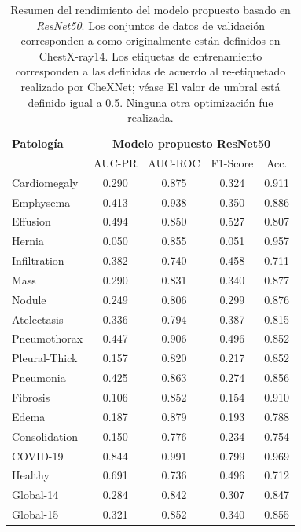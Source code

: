 {\begin{table}[tb]
    \centering
    \begin{tabular}{|l||c|c|c|c|}
        \hline
    {\bf Patología} 	    	&	\multicolumn{4}{c|}{\bf Modelo propuesto ResNet50}  \\
    \cline{2-5}
                        &	AUC-PR	&	AUC-ROC 	& F1-Score  & Acc.  \\
        \hline \hline
        Cardiomegaly	&	0.290	&	0.875	&	0.324	&	0.911	\\
        Emphysema	    &	0.413	&	0.938	&	0.350	&	0.886	\\
        Effusion	    &	0.494	&	0.850	&	0.527	&	0.807	\\
        Hernia	        &	0.050	&	0.855	&	0.051	&	0.957	\\
        Infiltration	&	0.382	&	0.740	&	0.458	&	0.711	\\
        Mass	        &	0.290	&	0.831	&	0.340	&	0.877	\\
        Nodule	        &	0.249	&	0.806	&	0.299	&	0.876	\\
        Atelectasis	    &	0.336	&	0.794	&	0.387	&	0.815	\\
        Pneumothorax	&	0.447	&	0.906	&	0.496	&	0.852	\\
        Pleural-Thick	&	0.157	&	0.820	&	0.217	&	0.852	\\
        Pneumonia	    &	0.425	&	0.863	&	0.274	&	0.856	\\
        Fibrosis	    &	0.106	&	0.852	&	0.154	&	0.910	\\
        Edema	        &	0.187	&	0.879	&	0.193	&	0.788	\\
        Consolidation	&	0.150	&	0.776	&	0.234	&	0.754	\\
        \hline
        COVID-19	    &	0.844	&	0.991	&	0.799	&	0.969	\\
        Healthy	        &	0.691	&	0.736	&	0.496	&	0.712	\\
        \hline\hline
        Global-14	    &	0.284	&	0.842	&	0.307	&	0.847	\\
        Global-15	    &	0.321	&	0.852	&	0.340	&	0.855	\\
    \hline
    \end{tabular}
    \caption{Resumen del rendimiento del modelo propuesto basado en \textit{ResNet50}.
            Los conjuntos de datos de validación corresponden a como originalmente
            están definidos en ChestX-ray14. Los etiquetas de entrenamiento corresponden a las
            definidas de acuerdo al re-etiquetado realizado por CheXNet; véase \cite{rajpurkar2018deep}
            El valor de umbral está definido igual a 0.5. Ninguna otra optimización fue realizada.}
    \label{table:res-model-covid}
\end{table}

}
